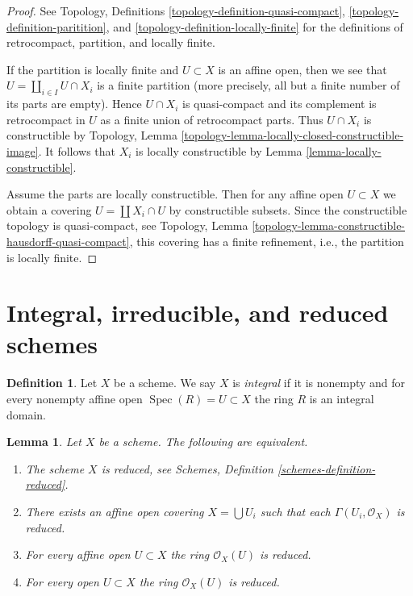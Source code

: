\documentclass{stacks-project}
\theoremstyle{plain}
\newtheorem{lemma}[subsection]{Lemma}
\theoremstyle{definition}
\newtheorem{definition}[subsection]{Definition}
\theoremstyle{remark}
\numberwithin{equation}{subsection}
\def\Spec{\mathop{\mathrm{Spec}}}
\begin{document}
\begin{proof}
See Topology, Definitions
\ref{topology-definition-quasi-compact},
\ref{topology-definition-paritition}, and
\ref{topology-definition-locally-finite}
for the definitions of retrocompact, partition, and locally finite.

\medskip\noindent
If the partition is locally finite and $U \subset X$ is an
affine open, then we see that $U = \coprod_{i \in I} U \cap X_i$
is a finite partition (more precisely, all but a finite number
of its parts are empty). Hence $U \cap X_i$ is quasi-compact
and its complement is retrocompact in $U$ as a finite union
of retrocompact parts. Thus $U \cap X_i$ is constructible
by Topology, Lemma \ref{topology-lemma-locally-closed-constructible-image}.
It follows that $X_i$ is locally constructible by
Lemma \ref{lemma-locally-constructible}.

\medskip\noindent
Assume the parts are locally constructible. Then for any affine
open $U \subset X$ we obtain a covering $U = \coprod X_i \cap U$
by constructible subsets. Since the constructible topology is
quasi-compact, see
Topology, Lemma \ref{topology-lemma-constructible-hausdorff-quasi-compact},
this covering has a finite refinement, i.e.,
the partition is locally finite.
\end{proof}




\section{Integral, irreducible, and reduced schemes}
\label{section-integral}

\begin{definition}
\label{definition-integral}
Let $X$ be a scheme. We say $X$ is {\it integral} if it is nonempty and
for every nonempty affine open $\Spec(R) = U \subset X$ the ring $R$
is an integral domain.
\end{definition}

\begin{lemma}
\label{lemma-characterize-reduced}
Let $X$ be a scheme.
The following are equivalent.
\begin{enumerate}
\item The scheme $X$ is reduced, see
Schemes, Definition \ref{schemes-definition-reduced}.
\item There exists an affine open covering $X = \bigcup U_i$
such that each $\Gamma(U_i, \mathcal{O}_X)$ is reduced.
\item For every affine open $U \subset X$ the ring
$\mathcal{O}_X(U)$ is reduced.
\item For every open $U \subset X$ the ring $\mathcal{O}_X(U)$ is reduced.
\end{enumerate}
\end{lemma}
\end{document}
